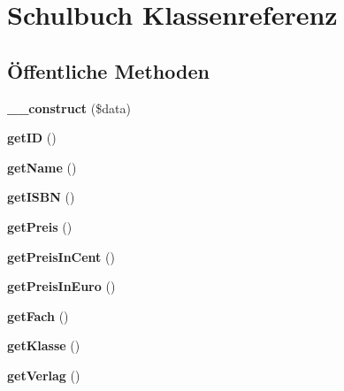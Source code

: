 \hypertarget{class_schulbuch}{}\section{Schulbuch Klassenreferenz}
\label{class_schulbuch}
\subsection*{Öffentliche Methoden}
\begin{DoxyCompactItemize}
\item 
\mbox{\label{class_schulbuch_a700344464e55c2f53845da17ddeb58ad}} 
{\bfseries \+\_\+\+\_\+construct} (\$data)
\item 
\mbox{\label{class_schulbuch_aa416ff0128698d91c00193c4efaaede8}} 
{\bfseries get\+ID} ()
\item 
\mbox{\label{class_schulbuch_ae8a88c8b8757a5ec0c1452e125ea5504}} 
{\bfseries get\+Name} ()
\item 
\mbox{\label{class_schulbuch_a89b331d23c1085fe2ce960288f42cabf}} 
{\bfseries get\+I\+S\+BN} ()
\item 
\mbox{\label{class_schulbuch_a27d8351c6aec2d834b3da267896a205c}} 
{\bfseries get\+Preis} ()
\item 
\mbox{\label{class_schulbuch_afd11b803c0b33aa244f939d8e81c9e82}} 
{\bfseries get\+Preis\+In\+Cent} ()
\item 
\mbox{\label{class_schulbuch_abe7de2d6b861619ed249c641626aab61}} 
{\bfseries get\+Preis\+In\+Euro} ()
\item 
\mbox{\label{class_schulbuch_a50753a15f0c9b16ed13f7cda850a05eb}} 
{\bfseries get\+Fach} ()
\item 
\mbox{\label{class_schulbuch_a6027faebcc2422d1da0909d9823555c5}} 
{\bfseries get\+Klasse} ()
\item 
\mbox{\label{class_schulbuch_a2bf08aa03dc88c8d0775c1c5b3379f02}} 
{\bfseries get\+Verlag} ()
\item 

\end{DoxyCompactItemize}

